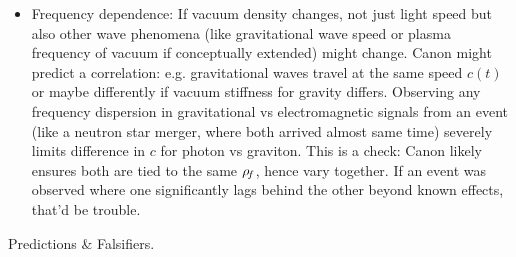 \documentclass[11pt]{article}
\begin{document}
\begin{itemize}
\item 
Frequency dependence: If vacuum density changes, not just light speed but also other wave phenomena (like gravitational wave speed or plasma frequency of vacuum if conceptually extended) might change. Canon might predict a correlation: e.g. gravitational waves travel at the same speed $c(t)$ or maybe differently if vacuum stiffness for gravity differs. Observing any frequency dispersion in gravitational vs electromagnetic signals from an event (like a neutron star merger, where both arrived almost same time) severely limits difference in $c$ for photon vs graviton. This is a check: Canon likely ensures both are tied to the same $\rho_{\!f}$, hence vary together. If an event was observed where one significantly lags behind the other beyond known effects, that’d be trouble.




\end{itemize}

Predictions & Falsifiers.
\end{document}

